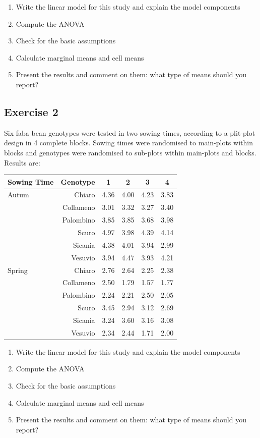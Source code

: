 \documentclass[a4paper,12pt,oneside]{book}
\providecommand{\tightlist}{%
  \setlength{\itemsep}{0pt}\setlength{\parskip}{0pt}}
\begin{document}
\begin{enumerate}
\def\labelenumi{\arabic{enumi}.}
\tightlist
\item
  Write the linear model for this study and explain the model components
\item
  Compute the ANOVA
\item
  Check for the basic assumptions
\item
  Calculate marginal means and cell means
\item
  Present the results and comment on them: what type of means should you report?
\end{enumerate}

\hypertarget{exercise-2-6}{%
\subsection{Exercise 2}\label{exercise-2-6}}

Six faba bean genotypes were tested in two sowing times, according to a plit-plot design in 4 complete blocks. Sowing times were randomised to main-plots within blocks and genotypes were randomised to sub-plots within main-plots and blocks. Results are:

\begin{longtable}[]{@{}lrcccc@{}}
\toprule
Sowing Time & Genotype & 1 & 2 & 3 & 4 \\
\midrule
\endhead
Autum & Chiaro & 4.36 & 4.00 & 4.23 & 3.83 \\
& Collameno & 3.01 & 3.32 & 3.27 & 3.40 \\
& Palombino & 3.85 & 3.85 & 3.68 & 3.98 \\
& Scuro & 4.97 & 3.98 & 4.39 & 4.14 \\
& Sicania & 4.38 & 4.01 & 3.94 & 2.99 \\
& Vesuvio & 3.94 & 4.47 & 3.93 & 4.21 \\
Spring & Chiaro & 2.76 & 2.64 & 2.25 & 2.38 \\
& Collameno & 2.50 & 1.79 & 1.57 & 1.77 \\
& Palombino & 2.24 & 2.21 & 2.50 & 2.05 \\
& Scuro & 3.45 & 2.94 & 3.12 & 2.69 \\
& Sicania & 3.24 & 3.60 & 3.16 & 3.08 \\
& Vesuvio & 2.34 & 2.44 & 1.71 & 2.00 \\
\bottomrule
\end{longtable}

\begin{enumerate}
\def\labelenumi{\arabic{enumi}.}
\tightlist
\item
  Write the linear model for this study and explain the model components
\item
  Compute the ANOVA
\item
  Check for the basic assumptions
\item
  Calculate marginal means and cell means
\item
  Present the results and comment on them: what type of means should you report?
\end{enumerate}
\end{document}
